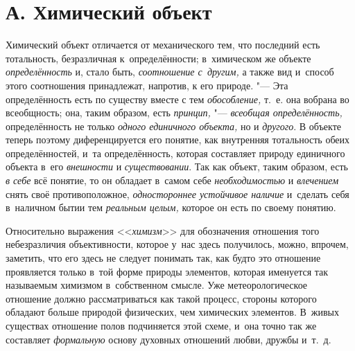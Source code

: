 \section[А. Химический объект]{А. Химический объект}

Химический объект отличается от механического тем, что
последний есть тотальность, безразличная к~определённости; в~химическом же
объекте {\em определённость}
и, стало быть,
{\em соотношение с~другим,}
а также вид и~способ этого соотношения принадлежат, напротив,
к его природе. "--- Эта определённость есть по существу вместе
с тем {\em обособление,}
т.~е. она вобрана во всеобщность; она, таким образом, есть
{\em принцип,} "---
{\em всеобщая определённость,}
определённость не только
{\em одного единичного объекта,}
но и {\em другого}.
В объекте теперь поэтому диференцируется его понятие, как
внутренняя тотальность обеих определённостей, и~та определённость, которая
составляет природу единичного объекта в~его
{\em внешности} и
{\em существовании}. Так
как объект, таким образом, есть {\em в
себе} всё понятие, то он обладает в~самом себе
{\em необходимостью} и
{\em влечением} снять
своё противоположное, {\em одностороннее
устойчивое наличие} и~сделать себя в~наличном бытии тем
{\em реальным целым,}
которое он есть по своему понятию.

Относительно выражения
<<{\em химизм}>> для
обозначения отношения того небезразличия объективности, которое у~нас здесь
получилось, можно, впрочем, заметить, что его здесь не следует понимать
так, как будто это отношение проявляется только в~той форме природы
элементов, которая именуется так называемым химизмом в~собственном смысле.
Уже метеорологическое отношение должно рассматриваться как такой процесс,
стороны которого обладают больше природой физических, чем химических
элементов. В~живых существах отношение полов подчиняется этой схеме, и~она
точно так же составляет
{\em формальную} основу
духовных отношений любви, дружбы
и~т.~д.

